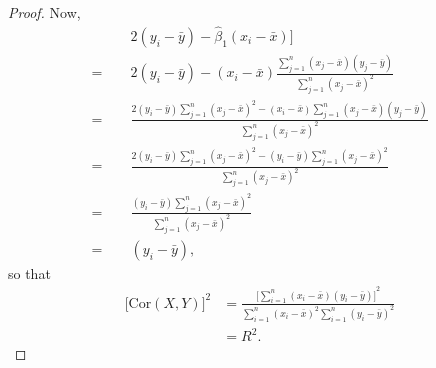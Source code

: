 \begin{proof}
    Now,
    \begin{equation*}
        \begin{split}
            \qquad &2(y_i - \bar{y}) - \hat{\beta}_1(x_i - \bar{x})] \\
            = \, &2(y_i - \bar{y}) - (x_i - \bar{x})
            \frac{\sum_{j=1}^{n}(x_j - \bar{x})(y_j - \bar{y})}
            {\sum_{j=1}^{n}{(x_j - \bar{x})}^{2}} \\
            = \, &\frac{2(y_i - \bar{y})\sum_{j=1}^{n}{(x_j - \bar{x})}^{2}
            - (x_i - \bar{x})\sum_{j=1}^{n}(x_j - \bar{x})(y_j - \bar{y})}
            {\sum_{j=1}^{n}{(x_j - \bar{x})}^{2}} \\
            = \, &\frac{2(y_i - \bar{y})\sum_{j=1}^{n}{(x_j - \bar{x})}^{2}
            - (y_i - \bar{y})\sum_{j=1}^{n}{(x_j - \bar{x})}^{2}}
            {\sum_{j=1}^{n}{(x_j - \bar{x})}^{2}} \\
            = \, &\frac{(y_i - \bar{y})\sum_{j=1}^{n}{(x_j - \bar{x})}^{2}}
            {\sum_{j=1}^{n}{(x_j - \bar{x})}^{2}} \\
            = \, &(y_i - \bar{y}),
        \end{split}
    \end{equation*}
    so that
    \begin{equation*}
        \begin{split}
            {\bigl[\text{Cor}(X, Y)\bigr]}^{2}
            &= \frac{{\bigl[\sum_{i=1}^{n}(x_i - \bar{x})(y_i - \bar{y})\bigr]}^{2}}
            {\sum_{i=1}^{n}{(x_i - \bar{x})}^{2}\sum_{i=1}^{n}{(y_i -
            \bar{y})}^{2}} \\
            &= R^2.
        \end{split}
    \end{equation*}
\end{proof}
